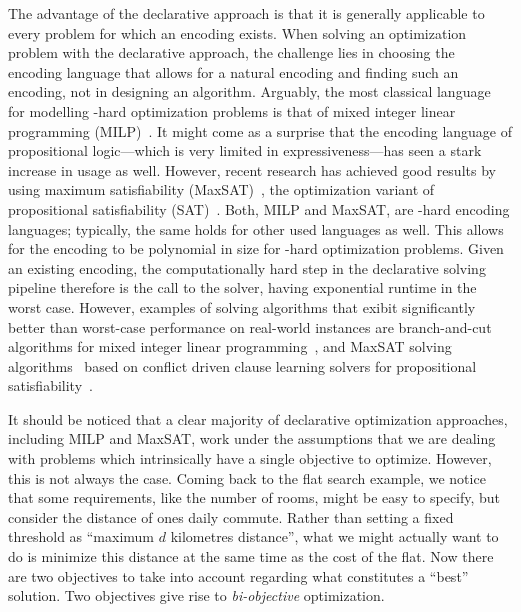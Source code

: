 The advantage of the declarative approach is that it is generally applicable to every problem for which an encoding exists.
When solving an optimization problem with the declarative approach, the challenge lies in choosing the encoding language that allows for a natural encoding and finding such an encoding, not in designing an algorithm.
Arguably, the most classical language for modelling \NP-hard optimization problems is that of mixed integer linear programming (MILP)~\autocites{ChenEtAl2010-intro,KorteVygen2018-5}.
It might come as a surprise that the encoding language of propositional logic---which is very limited in expressiveness---has seen a stark increase in usage as well.
However, recent research has achieved good results by using maximum satisfiability (MaxSAT)~\autocite{handbook2-maxsat}, the optimization variant of propositional satisfiability (SAT)~\autocite{handbook2-sat}.
Both, MILP and MaxSAT, are \NP-hard encoding languages;
typically, the same holds for other used languages as well.
This allows for the encoding to be polynomial in size for \NP-hard optimization problems.
Given an existing encoding, the computationally hard step in the declarative solving pipeline therefore is the call to the solver, having exponential runtime in the worst case.
However, examples of solving algorithms that exibit significantly better than worst-case performance on real-world instances are branch-and-cut algorithms for mixed integer linear programming~\autocite{ChenEtAl2010-branch-and-cut}, and MaxSAT solving algorithms~\autocite{handbook2-maxsat} based on conflict driven clause learning solvers for propositional satisfiability~\autocite{handbook2-cdcl}.

It should be noticed that a clear majority of declarative optimization approaches, including MILP and MaxSAT, work under the assumptions that we are dealing with problems which intrinsically have a single objective to optimize.
However, this is not always the case.
Coming back to the flat search example, we notice that some requirements, like the number of rooms, might be easy to specify, but consider the distance of ones daily commute.
Rather than setting a fixed threshold as ``maximum $d$ kilometres distance'', what we might actually want to do is minimize this distance at the same time as the cost of the flat.
Now there are two objectives to take into account regarding what constitutes a ``best'' solution.
Two objectives give rise to \emph{bi-objective} optimization.

